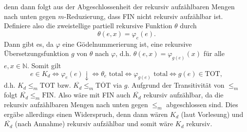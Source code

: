 \documentclass[german,headsepline]{scrartcl}
\theoremstyle{definition}
\begin{document}
\begin{solution}
\begin{enumerate}[(a)]
				denn dann folgt aus der Abgeschlossenheit der rekursiv aufzählbaren Mengen nach unten gegen $m$-Reduzierung,
				dass FIN nicht rekursiv aufzählbar ist.
				Definiere also die zweistellige partiell rekursive Funktion $\theta$ durch
				\[\theta(e,x)=\varphi_e(e).\]
				Dann gibt es, da $\varphi$ eine Gödelnummerierung ist,
				eine rekursive Übersetzungsfunktion $g$ von $\theta$ nach $\varphi$,
				d.h. $\theta(e,x)=\varphi_{g(e)}(x)$ für alle $e,x\in\mathbb{N}$.
				Somit gilt \[
					e\in K_d
					\Leftrightarrow\varphi_e(e)\downarrow
					\Leftrightarrow\theta_e\text{ total}
					\Leftrightarrow\varphi_{g(e)}\text{ total}
					\Leftrightarrow g(e)\in\text{TOT},
				\]
				d.h. $K_d\leq_m\text{TOT}$ bzw. $\overline{K_d}\leq_m\overline{\text{TOT}}$ via $g$.
				Aufgrund der Transitivität von $\leq_m$ folgt $\overline{K_d}\leq_m\text{FIN}$.
				Also wäre mit FIN auch $\overline{K_d}$ rekursiv aufzählbar,
				da die rekursiv aufzählbaren Mengen nach unten gegen $\leq_m$ abgeschlossen sind.
				Dies ergäbe allerdings einen Widerspruch,
				denn dann wären $K_d$ (laut Vorlesung) und $\overline{K_d}$ (nach Annahme) rekursiv aufzählbar und somit wäre $K_d$ rekursiv.
		\end{enumerate}
	\end{solution}
	
\end{document}
